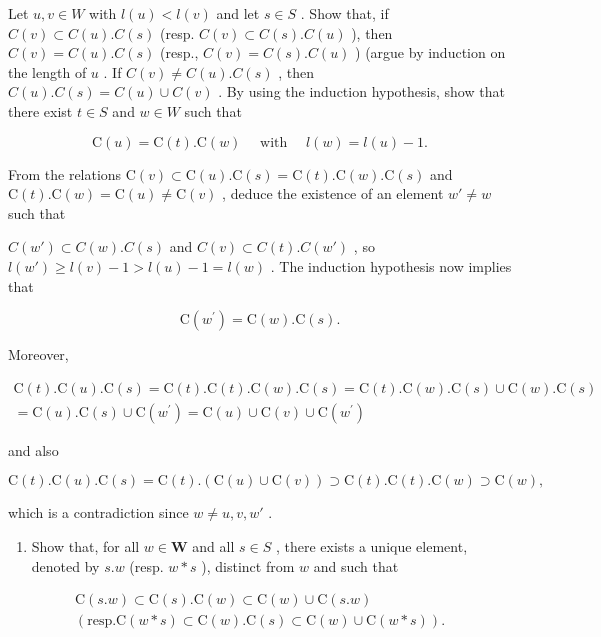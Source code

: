 Let \(u, v \in W\) with \(l(u) < l(v)\) and let \(s \in S\) . Show that, if \(C(v) \subset C(u).C(s)\) (resp. \(C(v) \subset C(s).C(u)\) ), then \(C(v) = C(u).C(s)\) (resp., \(C(v) = C(s).C(u)\) ) (argue by induction on the length of \(u\) . If \(C(v) \neq C(u).C(s)\) , then \(C(u).C(s) = C(u) \cup C(v)\) . By using the induction hypothesis, show that there exist \(t \in S\) and \(w \in W\) such that

\[
\mathrm{C} (u) = \mathrm{C} (t). \mathrm{C} (w) \quad \text { with } \quad l (w) = l (u) - 1.
\]

From the relations \(\mathrm{C}(v) \subset \mathrm{C}(u).\mathrm{C}(s) = \mathrm{C}(t).\mathrm{C}(w).\mathrm{C}(s)\) and \(\mathrm{C}(t).\mathrm{C}(w) = \mathrm{C}(u) \neq \mathrm{C}(v)\) , deduce the existence of an element \(w' \neq w\) such that

\(C(w') \subset C(w).C(s)\) and \(C(v) \subset C(t).C(w')\) , so \(l(w') \geqslant l(v) - 1 > l(u) - 1 = l(w)\) . The induction hypothesis now implies that

\[
\mathrm{C} (w ^ {\prime}) = \mathrm{C} (w). \mathrm{C} (s).
\]

Moreover,

\[
\begin{array}{c} \mathrm{C} (t). \mathrm{C} (u). \mathrm{C} (s) = \mathrm{C} (t). \mathrm{C} (t). \mathrm{C} (w). \mathrm{C} (s) = \mathrm{C} (t). \mathrm{C} (w). \mathrm{C} (s) \cup \mathrm{C} (w). \mathrm{C} (s) \\ = \mathrm{C} (u). \mathrm{C} (s) \cup \mathrm{C} (w ^ {\prime}) = \mathrm{C} (u) \cup \mathrm{C} (v) \cup \mathrm{C} (w ^ {\prime}) \end{array}
\]

and also

\[
\mathrm{C} (t). \mathrm{C} (u). \mathrm{C} (s) = \mathrm{C} (t). (\mathrm{C} (u) \cup \mathrm{C} (v)) \supset \mathrm{C} (t). \mathrm{C} (t). \mathrm{C} (w) \supset \mathrm{C} (w),
\]

which is a contradiction since \(w \neq u, v, w'\) .

\begin{enumerate}
\def\labelenumi{\alph{enumi})}
\setcounter{enumi}{2}
\tightlist
\item
  Show that, for all \(w \in \mathbf{W}\) and all \(s \in S\) , there exists a unique element, denoted by \(s.w\) (resp. \(w * s\) ), distinct from \(w\) and such that
\end{enumerate}

\[
\begin{array}{c} \mathrm{C} (s. w) \subset \mathrm{C} (s). \mathrm{C} (w) \subset \mathrm{C} (w) \cup \mathrm{C} (s. w) \\ (\text {resp.} \mathrm{C} (w * s) \subset \mathrm{C} (w). \mathrm{C} (s) \subset \mathrm{C} (w) \cup \mathrm{C} (w * s)). \end{array}
\]

